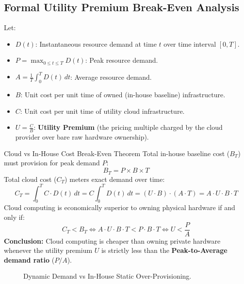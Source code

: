 \subsection{Formal Utility Premium Break-Even Analysis}
Let:
\begin{itemize}[leftmargin=*]
  \item $D(t)$: Instantaneous resource demand at time $t$ over time interval $[0, T]$.
  \item $P = \max_{0 \le t \le T} D(t)$: Peak resource demand.
  \item $A = \frac{1}{T} \int_{0}^{T} D(t)\, dt$: Average resource demand.
  \item $B$: Unit cost per unit time of owned (in-house baseline) infrastructure.
  \item $C$: Unit cost per unit time of utility cloud infrastructure.
  \item $U = \frac{C}{B}$: \textbf{Utility Premium} (the pricing multiple charged by the cloud provider over bare raw hardware ownership).
\end{itemize}

\begin{thmbox}{Cloud vs In-House Cost Break-Even Theorem}
Total in-house baseline cost ($B_T$) must provision for peak demand $P$:
\begin{equation}
B_T = P \times B \times T
\end{equation}
Total cloud cost ($C_T$) meters exact demand over time:
\begin{equation}
C_T = \int_{0}^{T} C \cdot D(t)\, dt = C \int_{0}^{T} D(t)\, dt = (U \cdot B) \cdot (A \cdot T) = A \cdot U \cdot B \cdot T
\end{equation}
Cloud computing is economically superior to owning physical hardware if and only if:
\begin{equation}
C_T < B_T \iff A \cdot U \cdot B \cdot T < P \cdot B \cdot T \iff U < \frac{P}{A}
\end{equation}
\textbf{Conclusion:} Cloud computing is cheaper than owning private hardware whenever the utility premium $U$ is strictly less than the \textbf{Peak-to-Average demand ratio} ($P/A$).
\end{thmbox}

\begin{figure}[H]
\centering
{}
\caption{Dynamic Demand vs In-House Static Over-Provisioning.}
\end{figure}

